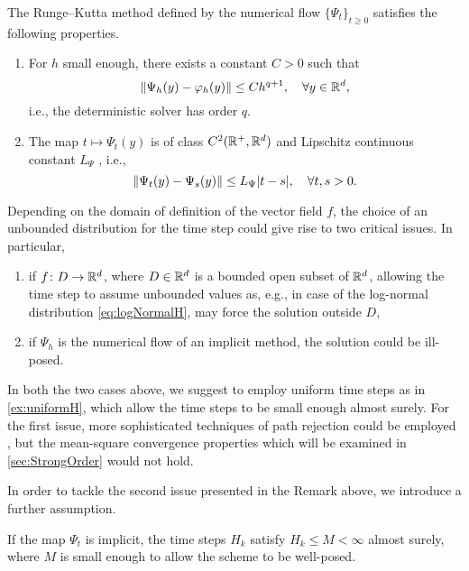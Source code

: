 \documentclass[10pt]{article}
\begin{document}
\begin{assumption}\label{as:PsiStrong} The Runge--Kutta method defined by the numerical flow $\{\Psi_t\}_{t\geq 0}$ satisfies the following properties.
	\begin{enumerate}
		\item\label{as:PsiStrong_Order} For $h$ small enough, there exists a constant $C > 0$ such that
		\begin{equation}
		\lVert\Psi_h(y) - \varphi_h(y)\rVert \leq Ch^{q+1}, \quad \forall y \in \mathbb{R}^d,
		\end{equation}
		i.e., the deterministic solver has order $q$.
		\item\label{as:PsiStrong_Time} The map $t \mapsto \Psi_t(y)$ is of class $C^2(\mathbb{R}^+, \mathbb{R}^d)$ and Lipschitz continuous  constant $L_\Psi$ , i.e.,
		\begin{equation}\label{eq:LipschitzPsiT}
		\lVert\Psi_t(y) - \Psi_s(y)\rVert \leq L_\Psi \lvert t - s\rvert, \quad \forall t, s > 0.
		\end{equation}
	\end{enumerate}
\end{assumption}

\begin{remark} Depending on the domain of definition of the vector field $f$, the choice of an unbounded distribution for the time step could give rise to two critical issues. In particular, 
	\begin{enumerate}
		\item if $f\colon D \to \mathbb{R}^d$, where $D \in \mathbb{R}^d$ is a bounded open subset of $\mathbb{R}^d$, allowing the time step to assume unbounded values as, e.g., in case of the log-normal distribution \eqref{eq:logNormalH}, may force the solution outside $D$,
		\item if $\Psi_h$ is the numerical flow of an implicit method, the solution could be ill-posed.
	\end{enumerate}
	In both the two cases above, we suggest to employ uniform time steps as in \cref{ex:uniformH}, which allow the time steps to be small enough almost surely. For the first issue, more sophisticated techniques of path rejection could be employed \cite{MiT05}, but the mean-square convergence properties which will be examined in \cref{sec:StrongOrder} would not hold. 
\end{remark}

In order to tackle the second issue presented in the Remark above, we introduce a further assumption.

\begin{assumption}\label{as:hImplicit} If the map $\Psi_t$ is implicit, the time steps $H_k$ satisfy $H_k \leq M < \infty$ almost surely, where $M$ is small enough to allow the scheme to be well-posed.
\end{assumption}
\end{document}

